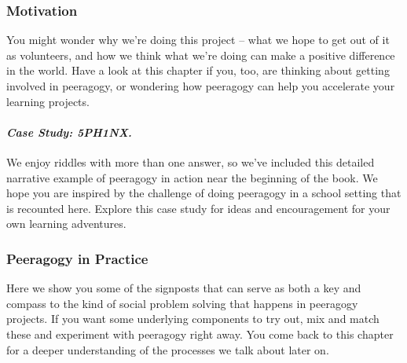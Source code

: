 



\subsubsection{Motivation}
\noindent You might wonder why we're doing this project -- what we
hope to get out of it as volunteers, and how we think what we're doing
can make a positive difference in the world. Have a look at this
chapter if you, too, are thinking about getting involved in peeragogy,
or wondering how peeragogy can help you accelerate your learning
projects.

\paragraph{\emph{Case Study: 5PH1NX.}}
We enjoy riddles with more than one answer, so we've included this
detailed narrative example of peeragogy in action near the beginning
of the book. We hope you are inspired by the challenge of doing
peeragogy in a school setting that is recounted here. Explore this
case study for ideas and encouragement for your own learning
adventures.

\subsubsection{Peeragogy in Practice}

\noindent Here we show you some of the signposts that can serve as
both a key and compass to the kind of social problem solving that
happens in peeragogy projects. If you want some underlying components
to try out, mix and match these and experiment with peeragogy right
away. You come back to this chapter for a deeper understanding of the
processes we talk about later on. 

